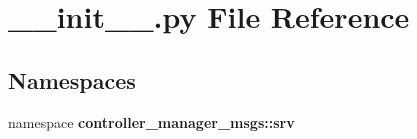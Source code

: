 \section{\-\_\-\-\_\-init\-\_\-\-\_\-.\-py \-File \-Reference}
\label{srv_2____init_____8py}
\subsection*{\-Namespaces}
\begin{DoxyCompactItemize}
\item 
namespace {\bf controller\-\_\-manager\-\_\-msgs\-::srv}
\end{DoxyCompactItemize}
